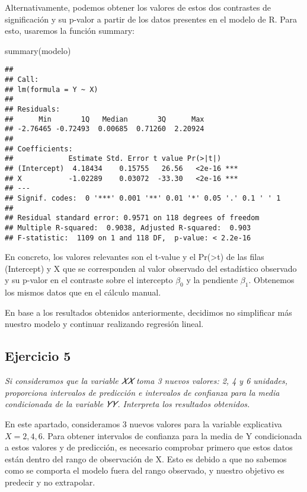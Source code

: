 \documentclass[
]{article}
\newenvironment{Shaded}{\begin{snugshade}}{\end{snugshade}}
\newcommand{\FunctionTok}[1]{\textcolor[rgb]{0.00,0.00,0.00}{#1}}
\newcommand{\NormalTok}[1]{#1}
\begin{document}
Alternativamente, podemos obtener los valores de estos dos contrastes de
significación y su p-valor a partir de los datos presentes en el modelo
de R. Para esto, usaremos la función summary:

\begin{Shaded}
\begin{Highlighting}[]
\FunctionTok{summary}\NormalTok{(modelo)}
\end{Highlighting}
\end{Shaded}

\begin{verbatim}
## 
## Call:
## lm(formula = Y ~ X)
## 
## Residuals:
##      Min       1Q   Median       3Q      Max 
## -2.76465 -0.72493  0.00685  0.71260  2.20924 
## 
## Coefficients:
##             Estimate Std. Error t value Pr(>|t|)    
## (Intercept)  4.18434    0.15755   26.56   <2e-16 ***
## X           -1.02289    0.03072  -33.30   <2e-16 ***
## ---
## Signif. codes:  0 '***' 0.001 '**' 0.01 '*' 0.05 '.' 0.1 ' ' 1
## 
## Residual standard error: 0.9571 on 118 degrees of freedom
## Multiple R-squared:  0.9038, Adjusted R-squared:  0.903 
## F-statistic:  1109 on 1 and 118 DF,  p-value: < 2.2e-16
\end{verbatim}

En concreto, los valores relevantes son el t-value y el
Pr(\textgreater\textbar t\textbar) de las filas (Intercept) y X que se
corresponden al valor observado del estadístico observado y su p-valor
en el contraste sobre el intercepto \(\beta_0\) y la pendiente
\(\beta_1\). Obtenemos los mismos datos que en el cálculo manual.

En base a los resultados obtenidos anteriormente, decidimos no
simplificar más nuestro modelo y continuar realizando regresión lineal.

\hypertarget{ejercicio-5}{%
\subsection{Ejercicio 5}\label{ejercicio-5}}

\textit{Si consideramos que la variable 𝑋𝑋 toma 3 nuevos valores: 2, 4 y 6 unidades, proporciona intervalos de predicción e intervalos de confianza para la media condicionada de la variable 𝑌𝑌. Interpreta los resultados obtenidos.}

En este apartado, consideramos 3 nuevos valores para la variable
explicativa \(X = 2, 4, 6\). Para obtener intervalos de confianza para
la media de Y condicionada a estos valores y de predicción, es necesario
comprobar primero que estos datos están dentro del rango de observación
de X. Esto es debido a que no sabemos como se comporta el modelo fuera
del rango observado, y nuestro objetivo es predecir y no extrapolar.
\end{document}
